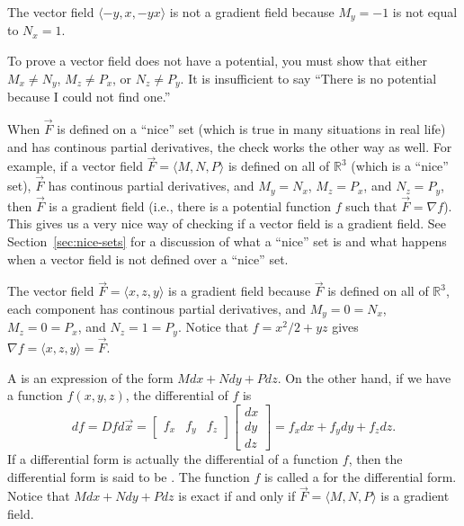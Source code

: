 \begin{example}
The vector field $\langle-y,x,-yx\rangle$ is not a
  gradient field because {$M_y=-1$} is not equal to {$N_x=1$}.
\end{example}
To prove a vector field does not have a potential, you must show that
either $M_x\neq N_y$, $M_z\neq P_x$, or $N_z\neq P_y$. It is insufficient to
say ``There is no potential because I could not find one.''


When $\vec F$ is defined on a ``nice'' set (which is true in many
situations in real life) and has continous partial derivatives, the check
works the other way as well.  For example, if a vector field $\vec
F=\langle M,N,P\rangle$ is defined on all of $\mathbb{R}^3$ (which is a ``nice''
set), $\vec F$ has continous partial derivatives, and $M_y=N_x$,
$M_z=P_x$, and $N_z=P_y$, then $\vec F$ is a gradient field (i.e.,
there is a potential function $f$ such that $\vec F = \nabla f$).  This
gives us a very nice way of checking if a vector field is a gradient
field.  See Section~\ref{sec:nice-sets} for a discussion of what a ``nice'' set is
and what happens when a vector field is not defined over a ``nice''
set.


\begin{example}
The vector field $\vec F=\langle x,z,y\rangle$ is
  a gradient field because $\vec F$ is defined on all of
  $\mathbb{R}^3$, each component has continous partial derivatives,
  and $M_y=0=N_x$, $M_z=0=P_x$, and $N_z=1=P_y$.  Notice that
  $f=x^2/2+yz$ gives $\nabla f = \langle x,z,y\rangle=\vec F$.
\end{example}

\begin{definition}
A  is an
expression of the form {$Mdx+Ndy+Pdz$}.  On the other hand, if we have
a function $f(x,y,z)$, the differential of $f$ is 
$$df = Df d\vec x
= \begin{bmatrix}f_x&f_y&f_z
\end{bmatrix}\begin{bmatrix}dx\\dy\\dz\end{bmatrix}=f_x dx+f_y dy+f_z
dz.$$ If a differential form is actually the differential of a
function {$f$}, then the differential form is said to be
.  The function {$f$} is called a  for the
differential form.  Notice that {$Mdx+Ndy+Pdz$} is exact if and only
if {$\vec F = \langle M,N,P\rangle$} is a gradient field.
\end{definition}

